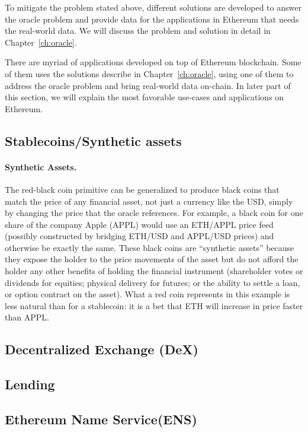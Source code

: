 To mitigate the problem stated above, different solutions are developed to answer the oracle problem and provide data for the applications in Ethereum that needs the real-world data. We will discuss the problem and solution in detail in Chapter~\ref{ch:oracle}.

There are myriad of applications developed on top of Ethereum blockchain. Some of them uses the solutions describe in  Chapter~\ref{ch:oracle}, using one of them to address the oracle problem and bring real-world data on-chain. In later part of this section, we will explain the most favorable use-cases and applications on Ethereum.

\subsection{Stablecoins/Synthetic assets}

\paragraph{Synthetic Assets.} The red-black coin primitive can be generalized to produce black coins that match the price of any financial asset, not just a currency like the USD, simply by changing the price that the oracle references. For example, a black coin for one share of the company Apple (APPL) would use an ETH/APPL price feed (possibly constructed by bridging ETH/USD and APPL/USD prices) and otherwise be exactly the same. These black coins are ``synthetic assets'' because they expose the holder to the price movements of the asset but do not afford the holder any other benefits of holding the financial instrument (\eg shareholder votes or dividends for equities; physical delivery for futures; or the ability to settle a loan, or option contract on the asset). What a red coin represents in this example is less natural than for a stablecoin: it is a bet that ETH will increase in price faster than APPL.

\subsection{Decentralized Exchange (DeX)}

\subsection{Lending}

\subsection{Ethereum Name Service(ENS)}


